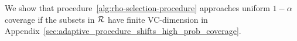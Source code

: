 
We show that procedure~\ref{alg:rho-selection-procedure}
approaches uniform $1 - \alpha$ coverage if the subsets
in $\mathcal{R}$ have finite VC-dimension in Appendix~\ref{sec:adaptive_procedure_shifts_high_prob_coverage}.

%
